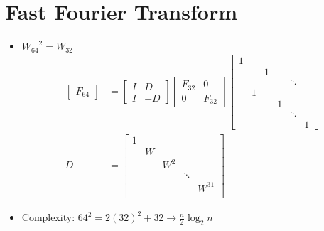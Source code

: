 \documentclass[a4paper,12pt]{article}
\theoremstyle{definition} \newtheorem{Theorem}{Theorem}
\begin{document}
\section{Fast Fourier Transform}
\begin{itemize}
\item ${W_{64}} ^ 2 = W_{32}$
\begin{align*}
\begin{bmatrix}
F_{64}
\end{bmatrix}&=
\begin{bmatrix}
I & D \\
I & -D
\end{bmatrix}
\begin{bmatrix}
F_{32} & 0    \\
0    & F_{32}
\end{bmatrix}
\begin{bmatrix}
1 &   &   &   &        &         \\
  &   & 1 &   &        &         \\
  &   &   &   & \ddots &         \\
  & 1 &   &   &        &         \\
  &   &   & 1 &        &         \\
  &   &   &   &  \ddots      &   \\
  &   &   &   &        & 1       
\end{bmatrix} \\
D &=  \begin{bmatrix}
	1 &   &     &        & 		\\
	  & W &     &        & 		\\
	  &   & W^2 &        & 		\\
	  &   &     & \ddots &        \\
	  &   &     &        & W^{31}	\\
	\end{bmatrix}
\end{align*}

\item Complexity: $64^2 = 2(32)^2 + 32 \rightarrow \frac{n}{2} \log_2 n$

\end{itemize}
\end{document}

